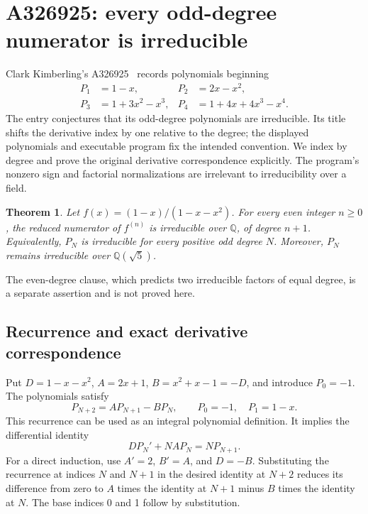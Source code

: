 \documentclass[11pt]{article}
\newtheorem{theorem}{Theorem}[section]
\newcommand{\Q}{\mathbb Q}
\begin{document}
\section{A326925: every odd-degree numerator is irreducible}

Clark Kimberling's A326925~\cite{A326925} records polynomials beginning
\[
\begin{aligned}
P_1&=1-x,& P_2&=2x-x^2,\\
P_3&=1+3x^2-x^3,& P_4&=1+4x+4x^3-x^4.
\end{aligned}
\]
The entry conjectures that its odd-degree polynomials are irreducible.
Its title shifts the derivative index by one relative to the degree;
the displayed polynomials and executable program fix the intended
convention. We index by degree and prove the original derivative
correspondence explicitly. The program's nonzero sign and factorial
normalizations are irrelevant to irreducibility over a field.

\begin{theorem}\label{thm:odd}
Let $f(x)=(1-x)/(1-x-x^2)$. For every even integer $n\geq0$, the reduced
numerator of $f^{(n)}$ is irreducible over $\Q$, of degree $n+1$.
Equivalently, $P_N$ is irreducible for every positive odd degree $N$.
Moreover, $P_N$ remains irreducible over $\Q(\sqrt5)$.
\end{theorem}

The even-degree clause, which predicts two irreducible factors of equal
degree, is a separate assertion and is not proved here.

\subsection{Recurrence and exact derivative correspondence}

Put $D=1-x-x^2$, $A=2x+1$, $B=x^2+x-1=-D$, and introduce $P_0=-1$.
The polynomials satisfy
\begin{equation}\label{eq:recurrence8}
P_{N+2}=AP_{N+1}-BP_N,\qquad P_0=-1,\quad P_1=1-x.
\end{equation}
This recurrence can be used as an integral polynomial definition. It
implies the differential identity
\begin{equation}\label{eq:diff8}
D P_N'+N A P_N=N P_{N+1}.
\end{equation}
For a direct induction, use $A'=2$, $B'=A$, and $D=-B$. Substituting
the recurrence at indices $N$ and $N+1$ in the desired identity at
$N+2$ reduces its difference from zero to $A$ times the identity at
$N+1$ minus $B$ times the identity at $N$. The base indices 0 and 1
follow by substitution.
\end{document}
